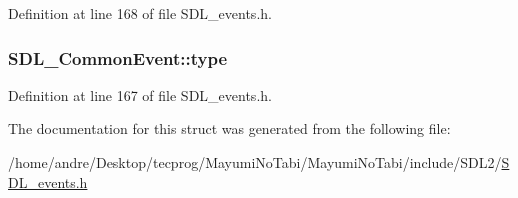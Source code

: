 Definition at line 168 of file S\-D\-L\-\_\-events.\-h.

\hypertarget{struct_s_d_l___common_event_a4ecd888325355321b42b2e2956f27453}{
\subsubsection[{type}]{ S\-D\-L\-\_\-\-Common\-Event\-::type}}\label{struct_s_d_l___common_event_a4ecd888325355321b42b2e2956f27453}


Definition at line 167 of file S\-D\-L\-\_\-events.\-h.



The documentation for this struct was generated from the following file\-:\begin{DoxyCompactItemize}
\item 
/home/andre/\-Desktop/tecprog/\-Mayumi\-No\-Tabi/\-Mayumi\-No\-Tabi/include/\-S\-D\-L2/\hyperlink{_s_d_l__events_8h}{S\-D\-L\-\_\-events.\-h}\end{DoxyCompactItemize}
